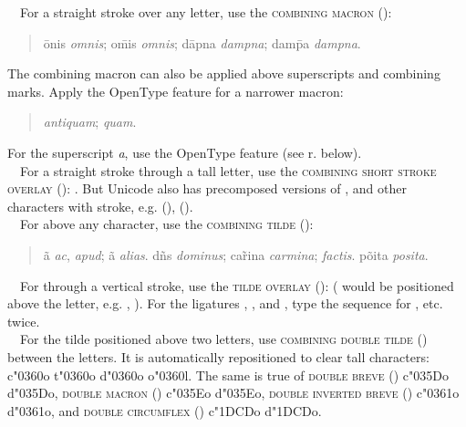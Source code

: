 \noindent{}\ \ For a straight stroke over any letter, use the \textsc{combining macron} ():
\begin{quote}
\=onis \textit{omnis}; o\={m}is \textit{omnis}; d\=apna \textit{dampna}; dam\={p}a
\textit{dampna}.
\end{quote}
The combining macron can also be applied above superscripts and combining marks. Apply the OpenType feature
 for a narrower macron:
\begin{quote}
 \textit{antiquam};  \textit{quam}.
\end{quote}
For the superscript \textit{a}, use the OpenType feature  (see r. below).\\[1ex]

\noindent{}\ \ For a straight stroke through a tall letter, use the \textsc{combining short stroke overlay} (): . But Unicode also has precomposed versions of
,  and other characters \mbox{with} stroke, e.g.
\textex{{\dj}} (),  ().\\[1ex]

\noindent{}\ \ For \textex{\~{}} above any character, use the \textsc{combining tilde} ():
\begin{quote}
\~a \textit{ac}, \textit{apud}; \~a \textit{alias}.\newline
d\~ns \textit{dominus}; ca\~{r}ina \textit{carmina};  \textit{factis}.\newline
p\~oita \textit{posita}.
\end{quote}

\noindent{}\ \ For \textex{\~{}} through a vertical stroke, use the \textsc{tilde overlay} ():
 ( would be positioned above the letter, e.g.
, ). For the ligatures
, , and , type the
sequence for , etc. twice.\\[1ex]

\noindent{}\ \ For the tilde positioned above two letters, use \textsc{combining double tilde}
() between the letters. It is
automatically repositioned to clear tall characters: c\char"0360o t\char"0360o d\char"0360o o\char"0360l. The same is true of
\textsc{double breve} () c\char"035Do d\char"035Do, \textsc{double macron} () c\char"035Eo d\char"035Eo,
\textsc{double inverted breve} () c\char"0361o d\char"0361o, and \textsc{double circumflex} ()
c\char"1DCDo d\char"1DCDo.\\[1ex]

